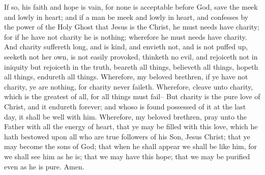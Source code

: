 If so, his faith and hope is vain, for none is acceptable before God, save the meek and lowly in heart; and if a man be meek and lowly in heart, and confesses by the power of the Holy Ghost that Jesus is the Christ, he must needs have charity; for if he have not charity he is nothing; wherefore he must needs have charity.
\bverse \iffalse And charity suffereth long, and is kind, and envieth not, and is not puffed up, seeketh not her own, is not easily provoked, thinketh no evil, and rejoiceth not in iniquity but rejoiceth in the truth, beareth all things, believeth all things, hopeth all things, endureth all things. \fi
And charity suffereth long, and is kind, and envieth not, and is not puffed up, seeketh not her own, is not easily provoked, thinketh no evil, and rejoiceth not in iniquity but rejoiceth in the truth, beareth all things, believeth all things, hopeth all things, endureth all things.
\bverse \iffalse Wherefore, my beloved brethren, if ye have not charity, ye are nothing, for charity never faileth. Wherefore, cleave unto charity, which is the greatest of all, for all things must fail-- \fi
Wherefore, my beloved brethren, if ye have not charity, ye are nothing, for charity never faileth. Wherefore, cleave unto charity, which is the greatest of all, for all things must fail--
\bverse \iffalse But charity is the pure love of Christ, and it endureth forever; and whoso is found possessed of it at the last day, it shall be well with him. \fi
But charity is the pure love of Christ, and it endureth forever; and whoso is found possessed of it at the last day, it shall be well with him.
\bverse \iffalse Wherefore, my beloved brethren, pray unto the Father with all the energy of heart, that ye may be filled with this love, which he hath bestowed upon all who are true followers of his Son, Jesus Christ; that ye may become the sons of God; that when he shall appear we shall be like him, for we shall see him as he is; that we may have this hope; that we may be purified even as he is pure. Amen. \fi
Wherefore, my beloved brethren, pray unto the Father with all the energy of heart, that ye may be filled with this love, which he hath bestowed upon all who are true followers of his Son, Jesus Christ; that ye may become the sons of God; that when he shall appear we shall be like him, for we shall see him as he is; that we may have this hope; that we may be purified even as he is pure. Amen.

